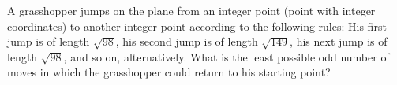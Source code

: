 A grasshopper jumps on the plane from an integer point (point with integer coordinates) to another integer point according to the following rules: His first jump is of length $\sqrt{98}$, his second jump is of length $\sqrt{149}$, his next jump is of length $\sqrt{98}$, and so on, alternatively. What is the least possible odd number of moves in which the grasshopper could return to his starting point?